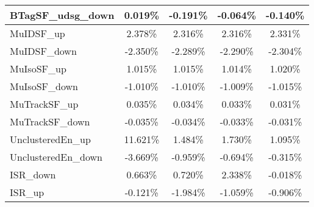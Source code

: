 \begin{table}[]
{\begin{tabular}{|l|c|c|c|c|}
BTagSF\_udsg\_down                          & 0.019\%                           & -0.191\%                           & -0.064\%                          & -0.140\%                           \\ \hline
MuIDSF\_up                             & 2.378\%                              & 2.316\%                              & 2.316\%                             & 2.331\%                              \\ \hline
MuIDSF\_down                           & -2.350\%                            & -2.289\%                            & -2.290\%                           & -2.304\%                            \\ \hline
MuIsoSF\_up                            & 1.015\%                             & 1.015\%                             & 1.014\%                            & 1.020\%                             \\ \hline
MuIsoSF\_down                          & -1.010\%                           & -1.010\%                           & -1.009\%                          & -1.015\%                           \\ \hline
MuTrackSF\_up                          & 0.035\%                           & 0.034\%                           & 0.033\%                          & 0.031\%                           \\ \hline
MuTrackSF\_down                        & -0.035\%                         & -0.034\%                         & -0.033\%                        & -0.031\%                         \\ \hline
UnclusteredEn\_up                         & 11.621\%                          & 1.484\%                          & 1.730\%                         & 1.095\%                          \\ \hline
UnclusteredEn\_down                      & -3.669\%                         & -0.959\%                        & -0.694\%                       & -0.315\%                        \\ \hline   \hline
ISR\_down                                & 0.663\%                                   & 0.720\%                                  & 2.338\%                                 & -0.018\%                                  \\ \hline
ISR\_up                                  & -0.121\%                                     & -1.984\%                                    & -1.059\%                                   & -0.906\%                                    \\ \hline

\end{tabular}}
\end{table}
